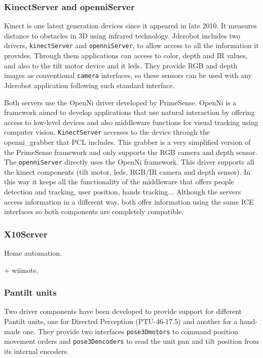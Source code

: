\documentclass[twocolumn]{svjour3}          %
\begin{document}
\subsubsection{KinectServer and openniServer}

Kinect is one latest generation devices since it appeared in late 2010. It measures distance to obstacles in 3D using infrared technology. Jderobot includes two drivers, \texttt{kinectServer} and \texttt{openniServer}, to allow access to all the information it provides. Through them applications can access to color, depth and IR values, and also to the tilt motor device and it leds. They provide RGB and depth images as conventional \texttt{camera} interfaces, so these sensors can be used with any Jderobot application following such standard interface.

Both servers use the OpenNi driver developed by PrimeSense. OpenNi is a framework aimed to develop applications that use natural interaction by offering access to low-level devices and also middleware functions for visual tracking using computer vision. \texttt{KinectServer} accesses to the device through the openni\_grabber that PCL includes. This grabber is a very simplified version of the PrimeSense framework and only supports the RGB camera and depth sensor. The \texttt{openniServer} directly uses the OpenNi framework. This driver supports all the kinect components (tilt motor, leds, RGB/IR camera and depth sensor). In this way it keeps all the functionality of the middleware that offers people detection and tracking, user position, hands tracking... Although the servers access information in a different way, both offer information using the same ICE interfaces so both components are completely compatible. 

\subsubsection{X10Server}

Home automation.

+ wiimote.

\subsubsection{Pantilt units}

Two driver components have been developed to provide support for different Pantilt units, one for Directed Perception (PTU-46-17.5) and another for a hand-made one. They provide two interfaces \texttt{pose3Dmotors} to command position movement orders and \texttt{pose3Dencoders} to read the unit pan and tilt position from its internal encoders.
\end{document}
